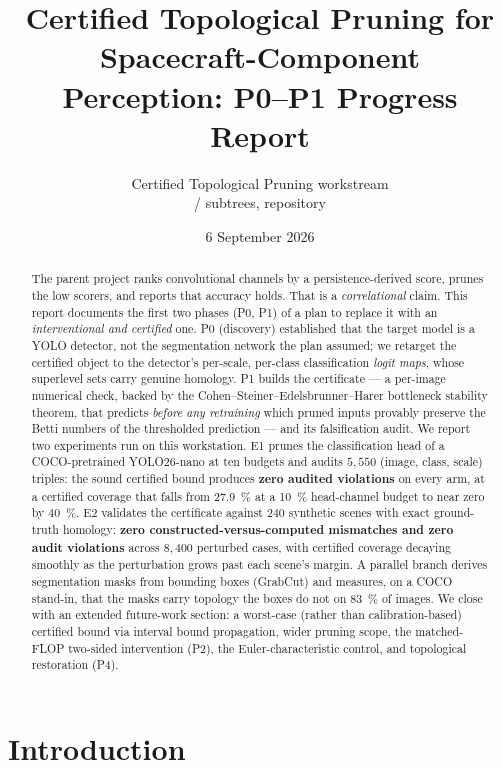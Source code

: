 \documentclass[11pt]{article}
\title{\textbf{Certified Topological Pruning for Spacecraft-Component\\
Perception: P0--P1 Progress Report}}
\author{Certified Topological Pruning workstream\\
\code{topo\_prune} / \code{seg\_masks} subtrees, \code{PEEK-TiNA} repository}
\date{6 September 2026}
\theoremstyle{definition}
\theoremstyle{plain}
\begin{document}
\maketitle

\begin{abstract}
The parent project ranks convolutional channels by a persistence-derived score,
prunes the low scorers, and reports that accuracy holds. That is a
\emph{correlational} claim. This report documents the first two phases (P0, P1) of
a plan to replace it with an \emph{interventional and certified} one. P0
(discovery) established that the target model is a YOLO detector, not the
segmentation network the plan assumed; we retarget the certified object to the
detector's per-scale, per-class classification \emph{logit maps}, whose
superlevel sets carry genuine homology. P1 builds the certificate --- a per-image
numerical check, backed by the Cohen--Steiner--Edelsbrunner--Harer bottleneck
stability theorem, that predicts \emph{before any retraining} which pruned inputs
provably preserve the Betti numbers of the thresholded prediction --- and its
falsification audit. We report two experiments run on this workstation. E1 prunes
the classification head of a COCO-pretrained YOLO26-nano at ten budgets and
audits $5{,}550$ (image, class, scale) triples: the sound certified bound
produces \textbf{zero audited violations} on every arm, at a certified coverage
that falls from \SI{27.9}{\percent} at a \SI{10}{\percent} head-channel budget to
near zero by \SI{40}{\percent}. E2 validates the certificate against
$240$ synthetic scenes with exact ground-truth homology: \textbf{zero
constructed-versus-computed mismatches and zero audit violations} across
$8{,}400$ perturbed cases, with certified coverage decaying smoothly as the
perturbation grows past each scene's margin. A parallel branch derives
segmentation masks from bounding boxes (GrabCut) and measures, on a COCO
stand-in, that the masks carry topology the boxes do not on \SI{83}{\percent} of
images. We close with an extended future-work section: a worst-case (rather than
calibration-based) certified bound via interval bound propagation, wider pruning
scope, the matched-FLOP two-sided intervention (P2), the Euler-characteristic
control, and topological restoration (P4).
\end{abstract}

\tableofcontents

\section{Introduction}
\end{document}
